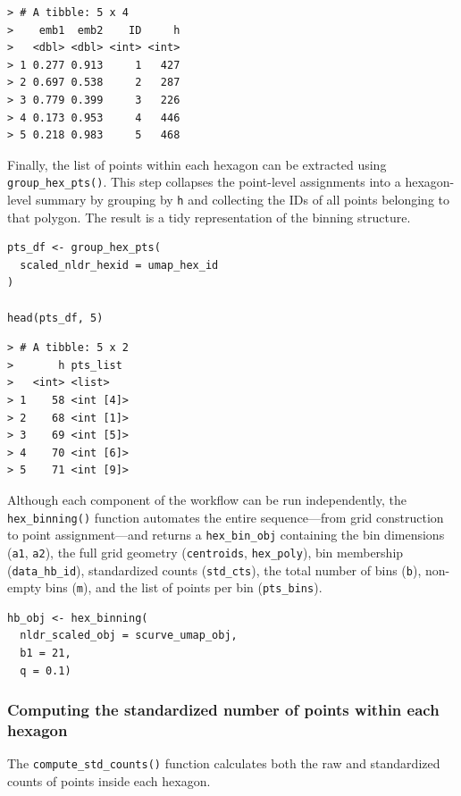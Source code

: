 \begin{verbatim}
> # A tibble: 5 x 4
>    emb1  emb2    ID     h
>   <dbl> <dbl> <int> <int>
> 1 0.277 0.913     1   427
> 2 0.697 0.538     2   287
> 3 0.779 0.399     3   226
> 4 0.173 0.953     4   446
> 5 0.218 0.983     5   468
\end{verbatim}

Finally, the list of points within each hexagon can be extracted using \texttt{group\_hex\_pts()}. This step collapses the point-level assignments into a hexagon-level summary by grouping by \texttt{h} and collecting the IDs of all points belonging to that polygon. The result is a tidy representation of the binning structure.

\begin{verbatim}
pts_df <- group_hex_pts(
  scaled_nldr_hexid = umap_hex_id
)

head(pts_df, 5)
\end{verbatim}

\begin{verbatim}
> # A tibble: 5 x 2
>       h pts_list 
>   <int> <list>   
> 1    58 <int [4]>
> 2    68 <int [1]>
> 3    69 <int [5]>
> 4    70 <int [6]>
> 5    71 <int [9]>
\end{verbatim}

Although each component of the workflow can be run independently, the \texttt{hex\_binning()} function automates the entire sequence---from grid construction to point assignment---and returns a \texttt{hex\_bin\_obj} containing the bin dimensions (\texttt{a1}, \texttt{a2}), the full grid geometry (\texttt{centroids}, \texttt{hex\_poly}), bin membership (\texttt{data\_hb\_id}), standardized counts (\texttt{std\_cts}), the total number of bins (\texttt{b}), non-empty bins (\texttt{m}), and the list of points per bin (\texttt{pts\_bins}).

\begin{verbatim}
hb_obj <- hex_binning(
  nldr_scaled_obj = scurve_umap_obj, 
  b1 = 21, 
  q = 0.1)
\end{verbatim}

\subsubsection{Computing the standardized number of points within each hexagon}\label{computing-the-standardized-number-of-points-within-each-hexagon}

The \texttt{compute\_std\_counts()} function calculates both the raw and standardized counts of points inside each hexagon.

